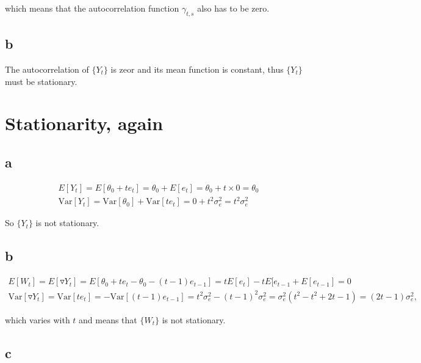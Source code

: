 \documentclass[]{book}
\begin{document}
which means that the autocorrelation function \(\gamma_{t,s}\) also has
to be zero.

\subsection*{b}\label{b-9}

The autocorrelation of \(\{Y_t\}\) is zeor and its mean function is
constant, thus \(\{Y_t\}\) must be stationary.

\section{Stationarity, again}\label{stationarity-again}

\subsection*{a}\label{a-10}

\begin{gather*}
  E[Y_t]= E[\theta_0 +  t e_t] = \theta_0 + E[e_t] = \theta_0+t \times 0 = \theta_0\\
\text{Var}[Y_t] = \text{Var}[\theta_0] + \text{Var}[t e_t] = 0 + t^2\sigma_e^2 = t^2\sigma_e^2
\end{gather*}

So \(\{Y_t\}\) is not stationary.

\subsection*{b}\label{b-10}

\begin{gather*}
  E[W_t] = E[\triangledown Y_t] = E[\theta_0 + te_t - \theta_0 - (t-1)e_{t-1}] =
    tE[e_t] - tE[e_{t-1} + E[e_{t-1}] = 0 \\
  \text{Var}[\triangledown Y_t] = \text{Var}[t e_t] = - \text{Var}[(t-1)e_{t-1}] = 
    t^2 \sigma_e^2 - (t-1)^2 \sigma_e^2 = \sigma_e^2 (t^2 - t^2 + 2t - 1) = (2t-1)\sigma_e^2,
\end{gather*}

which varies with \(t\) and means that \(\{W_t\}\) is not stationary.

\subsection*{c}\label{c-4}
\end{document}
